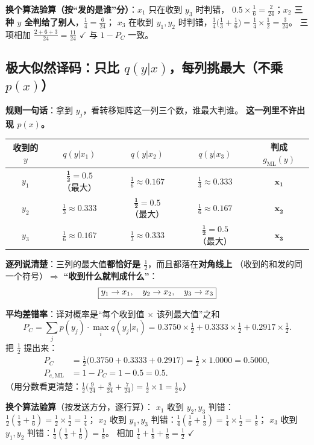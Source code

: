 \documentclass[11pt,a4paper]{ctexart}
\begin{document}
\textbf{换个算法验算（按“发的是谁”分）}：$x_1$ 只在收到 $y_3$ 时判错，
$0.5\times\frac16=\frac{2}{24}$；$x_2$ \textbf{三种 $y$ 全判给了别人}，$\frac14=\frac{6}{24}$；
$x_3$ 在收到 $y_1,y_2$ 时判错，$\frac14\bigl(\frac13+\frac16\bigr)=\frac14\times\frac12=\frac{3}{24}$。
三项相加 $\frac{2+6+3}{24}=\frac{11}{24}$ $\checkmark$ 与 $1-P_C$ 一致。

\subsection{极大似然译码：只比 $q(y|x)$，每列挑最大（\textbf{不乘 $p(x)$}）}

\textbf{规则一句话}：拿到 $y_j$，看转移矩阵这一列三个数，谁最大判谁。
\textbf{这一列里不许出现 $p(x)$。}

\begin{center}\small
\setlength{\tabcolsep}{6pt}
\begin{tabular}{@{}c|c|c|c|c@{}}
\toprule
收到的 $y$ & $q(y|x_1)$ & $q(y|x_2)$ & $q(y|x_3)$ & 判成 $g_{\mathrm{ML}}(y)$\\
\midrule
$y_1$ & $\mathbf{\tfrac12=0.5}$（最大） & $\tfrac16\approx0.167$ & $\tfrac13\approx0.333$ & $\mathbf{x_1}$\\
$y_2$ & $\tfrac13\approx0.333$ & $\mathbf{\tfrac12=0.5}$（最大） & $\tfrac16\approx0.167$ & $\mathbf{x_2}$\\
$y_3$ & $\tfrac16\approx0.167$ & $\tfrac13\approx0.333$ & $\mathbf{\tfrac12=0.5}$（最大） & $\mathbf{x_3}$\\
\bottomrule
\end{tabular}
\end{center}

\textbf{逐列说清楚}：三列的最大值\textbf{都恰好是 $\frac12$}，而且都落在\textbf{对角线上}
（收到的和发的同一个符号）$\Rightarrow$ \textbf{“收到什么就判成什么”}：
\[
\fbox{$y_1\to x_1,\quad y_2\to x_2,\quad y_3\to x_3$}
\]

\textbf{平均差错率}：译对概率是“每个收到值 $\times$ 该列最大值”之和
\[
P_C=\sum_{j}p(y_j)\cdot\max_i q(y_j|x_i)
=0.3750\times\tfrac12+0.3333\times\tfrac12+0.2917\times\tfrac12 .
\]
把 $\frac12$ 提出来：
\begin{align*}
P_C&=\tfrac12\bigl(0.3750+0.3333+0.2917\bigr)=\tfrac12\times1.0000=0.5000,\\
P_{e,\mathrm{ML}}&=1-P_C=1-0.5=\boxed{0.5}.
\end{align*}
（用分数看更清楚：$\frac12\bigl(\frac{9}{24}+\frac{8}{24}+\frac{7}{24}\bigr)=\frac12\times1=\frac12$。）

\textbf{换个算法验算}（按发送方分，逐行算）：
$x_1$ 收到 $y_2,y_3$ 判错：$\frac12(\frac13+\frac16)=\frac12\times\frac12=\frac14$；
$x_2$ 收到 $y_1,y_3$ 判错：$\frac14(\frac16+\frac13)=\frac14\times\frac12=\frac18$；
$x_3$ 收到 $y_1,y_2$ 判错：$\frac14(\frac13+\frac16)=\frac18$。
相加 $\frac14+\frac18+\frac18=\frac12$ $\checkmark$
\end{document}
